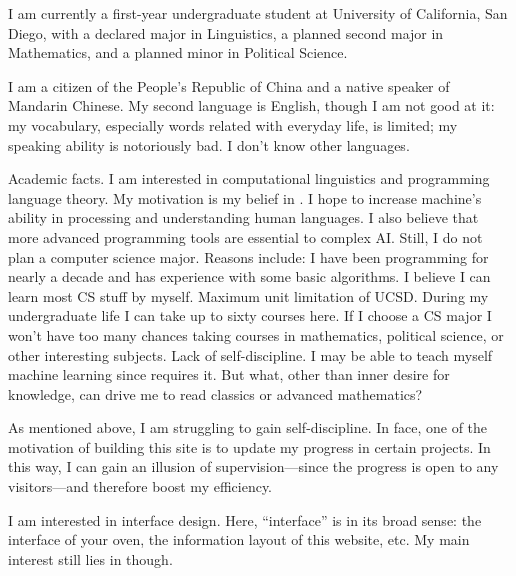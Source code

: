 

I am currently a first-year undergraduate student at University of California,
San Diego, with a declared major in Linguistics, a planned second major in
Mathematics, and a planned minor in Political Science.

I am a citizen of the People’s Republic of China and a native speaker of
Mandarin Chinese. My second language is English, though I am not good at it:
my vocabulary, especially words related with everyday life, is limited; my
speaking ability is notoriously bad. I don’t know other languages.

Academic facts. I am interested in computational linguistics and programming
language theory. My motivation is my belief in . I hope to
increase machine’s ability in processing and understanding human languages.
I also believe that more advanced programming tools are essential to complex
AI. Still, I do not plan a computer science major. Reasons include:
\@ulist
  \@item I have been programming for nearly a decade and has
    experience with some basic algorithms. I believe I can learn most CS stuff
    by myself.
  \@item Maximum unit limitation of UCSD. During my undergraduate life I can
    take up to sixty courses here. If I choose a CS major I won’t have too many
    chances taking courses in mathematics, political science, or other
    interesting subjects.
  \@item Lack of self-discipline. I may be able to teach myself machine learning
    since  requires it. But what, other than inner desire for
    knowledge, can drive me to read classics or advanced mathematics?


As mentioned above, I am struggling to gain self-discipline. In face, one of the
motivation of building this site is to update my progress in certain projects.
In this way, I can gain an illusion of supervision—since the progress is open to
any visitors—and therefore boost my efficiency.

I am interested in interface design. Here, “interface” is in its broad sense:
the interface of your oven, the information layout of this website, etc. My main
interest still lies in  though.

